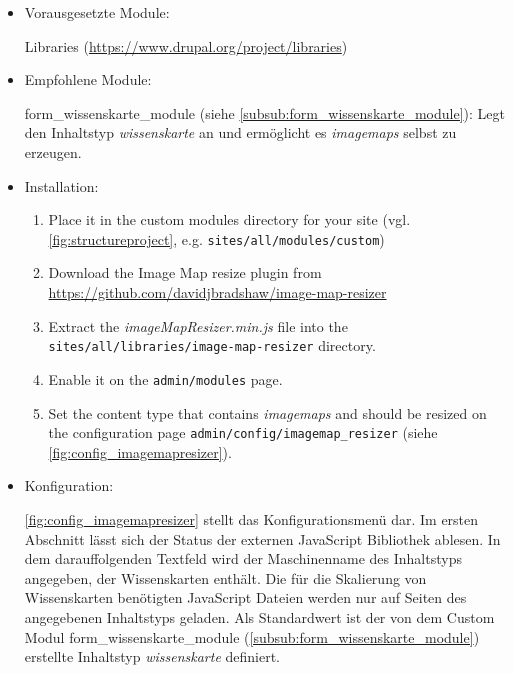 \begin{itemize}[parsep=0pt, itemsep=5.0pt plus 2.0pt minus 1.0pt, leftmargin=*]
	\item Vorausgesetzte Module:

	Libraries (\url{https://www.drupal.org/project/libraries})


	\item Empfohlene Module:

	form\_wissenskarte\_module (siehe \cref{subsub:form_wissenskarte_module}): Legt den Inhaltstyp \textit{wissenskarte} an und ermöglicht es \textit{\glspl{imagemap}} selbst zu erzeugen.

	\item Installation:
	\begin{enumerate}
		\item Place it in the custom modules directory for your site (vgl. \cref{fig:structureproject}, e.g. \lstinline|sites/all/modules/custom|)
		\item Download the Image Map resize plugin from \url{https://github.com/davidjbradshaw/image-map-resizer}
		\item Extract the \textit{imageMapResizer.min.js} file into the \lstinline|sites/all/libraries/image-map-resizer| directory.
		\item Enable it on the \lstinline|admin/modules| page.
		\item Set the content type that contains \textit{\glspl{imagemap}} and should be resized on the configuration page \lstinline|admin/config/imagemap_resizer| (siehe \cref{fig:config_imagemapresizer}).
	\end{enumerate}


	\item Konfiguration:

	\cref{fig:config_imagemapresizer} stellt das Konfigurationsmenü dar. Im ersten Abschnitt lässt sich der Status der externen JavaScript Bibliothek ablesen. In dem darauffolgenden Textfeld wird der Maschinenname des Inhaltstyps angegeben, der Wissenskarten enthält. Die für die Skalierung von Wissenskarten benötigten JavaScript Dateien werden nur auf Seiten des angegebenen Inhaltstyps geladen. Als Standardwert ist der von dem Custom Modul form\_wissenskarte\_module (\cref{subsub:form_wissenskarte_module}) erstellte Inhaltstyp \textit{wissenskarte} definiert.

\end{itemize}



\newpage
